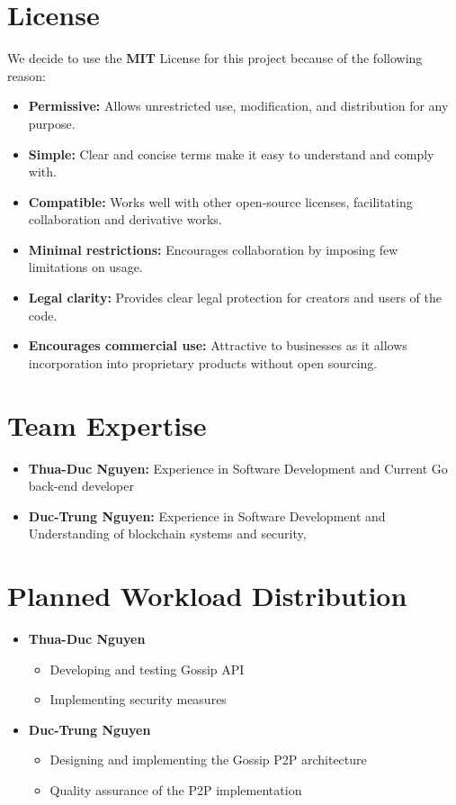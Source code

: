 \section{License}
We decide to use the \textbf{MIT} License for this project because of the following reason:
\begin{itemize}
    \item \textbf{Permissive:} Allows unrestricted use, modification, and distribution for any purpose.
    \item \textbf{Simple:} Clear and concise terms make it easy to understand and comply with.
    \item \textbf{Compatible:} Works well with other open-source licenses, facilitating collaboration and derivative works.
    \item \textbf{Minimal restrictions:} Encourages collaboration by imposing few limitations on usage.
    \item \textbf{Legal clarity:} Provides clear legal protection for creators and users of the code.
    \item \textbf{Encourages commercial use:} Attractive to businesses as it allows incorporation into proprietary products without open sourcing.
\end{itemize}

\section{Team Expertise}
\begin{itemize}
    \item \textbf{Thua-Duc Nguyen:} Experience in Software Development and Current Go back-end developer
    \item \textbf{Duc-Trung Nguyen:} Experience in Software Development and Understanding of blockchain systems and security,
\end{itemize}

\section{Planned Workload Distribution}
\begin{itemize}
    \item \textbf{Thua-Duc Nguyen}
    \begin{itemize}
        \item Developing and testing Gossip API
        \item Implementing security measures
    \end{itemize}
    \item \textbf{Duc-Trung Nguyen}
    \begin{itemize}
        \item Designing and implementing the Gossip P2P architecture
        \item Quality assurance of the P2P implementation
    \end{itemize}
\end{itemize}
